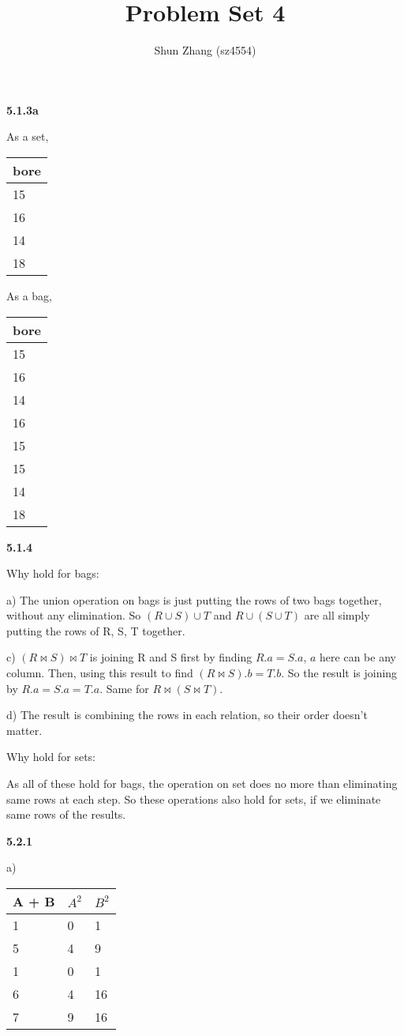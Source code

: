 \documentclass[12pt]{article}
\title{Problem Set 4}
\author{Shun Zhang (sz4554)}
\begin{document}
\maketitle

\textbf{5.1.3a}

As a set,

\begin{tabular}{l}
	bore \\
	\hline \hline
	15 \\
	16 \\
	14 \\
	18 \\
\end{tabular}

As a bag,

\begin{tabular}{l}
	bore \\
	\hline \hline
	15 \\
	16 \\
	14 \\
	16 \\
	15 \\
	15 \\
	14 \\
	18 \\
\end{tabular}

\textbf{5.1.4}

Why hold for bags:

a) The union operation on bags is just putting the rows of two bags together, without any elimination. So $(R\cup S)\cup T$ and $R\cup (S\cup T)$ are all simply putting the rows of R, S, T together.

c) $(R\Join S)\Join T$ is joining R and S first by finding $R.a=S.a$, $a$ here can be any column. Then, using this result to find $(R\Join S).b=T.b$. So the result is joining by $R.a=S.a=T.a$. Same for $R\Join (S\Join T)$.

d) The result is combining the rows in each relation, so their order doesn't matter.

Why hold for sets:

As all of these hold for bags, the operation on set does no more than eliminating same rows at each step. So these operations also hold for sets, if we eliminate same rows of the results.

\textbf{5.2.1}

a)

\begin{tabular}{l|l|l}
	A + B & $A^2$ & $B^2$ \\
	\hline \hline
	1 & 0 & 1 \\
	5 & 4 & 9 \\
	1 & 0 & 1 \\
	6 & 4 & 16 \\
	7 & 9 & 16 \\
\end{tabular}
\end{document}
